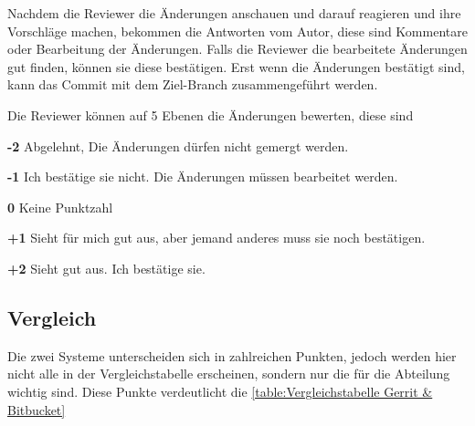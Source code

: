 Nachdem die Reviewer die Änderungen anschauen und darauf reagieren und ihre Vorschläge machen, bekommen die Antworten vom Autor, diese sind Kommentare oder Bearbeitung der Änderungen. Falls die Reviewer die bearbeitete Änderungen gut finden, können sie diese bestätigen. Erst wenn die Änderungen bestätigt sind, kann das Commit mit dem Ziel-Branch zusammengeführt werden.

Die Reviewer können auf 5 Ebenen die Änderungen bewerten, diese sind
\begin{compactitem}
	\item \textbf{-2} Abgelehnt, Die Änderungen dürfen nicht gemergt werden.
	\item \textbf{-1} Ich bestätige sie nicht. Die Änderungen müssen bearbeitet werden.
	\item \textbf{0}  Keine Punktzahl
	\item \textbf{+1} Sieht für mich gut aus, aber jemand anderes muss sie noch bestätigen.
	\item \textbf{+2} Sieht gut aus. Ich bestätige sie.
\end{compactitem}

\subsection{Vergleich}
\label{subsec:Vergleich_Bitbucket_Gerrit}

Die zwei Systeme unterscheiden sich in zahlreichen Punkten, jedoch werden hier nicht alle in der Vergleichstabelle erscheinen, sondern nur die für die Abteilung wichtig sind. Diese Punkte verdeutlicht die \cref{table:Vergleichstabelle Gerrit & Bitbucket}

